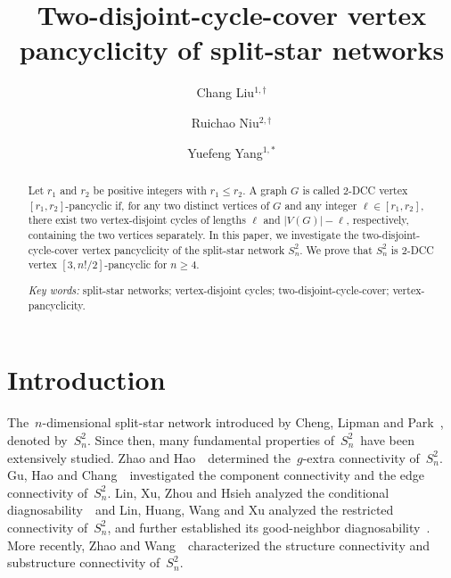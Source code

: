 \documentclass[12pt,a4paper]{amsart}
\title[Two-disjoint-cycle-cover vertex pancyclicity of split-star networks]{Two-disjoint-cycle-cover vertex pancyclicity of split-star networks}
\date{}
\author[Liu]{Chang Liu$^{1,\dagger}$}
\author[Niu]{Ruichao Niu$^{2,\dagger}$}
\author[Yang]{Yuefeng Yang$^{1,*}$}
\theoremstyle{definition}
\begin{document}
	
	\begin{abstract}

	Let $r_1$ and $r_2$ be positive integers with $r_1 \le r_2$. A graph $G$ is called $2$-DCC vertex $[r_1,r_2]$-pancyclic if, for any two distinct vertices of $G$ and any integer $\ell \in [r_1,r_2]$, there exist two vertex-disjoint cycles of lengths $\ell$ and $|V(G)|-\ell$, respectively, containing the two vertices separately. In this paper, we investigate the two-disjoint-cycle-cover vertex pancyclicity of the split-star network $S_n^2$. We prove that $S_n^2$ is $2$-DCC vertex $[3,n!/2]$-pancyclic for $n\ge4$.	
		
		
	\textit{Key words:} split-star networks; vertex-disjoint cycles; two-disjoint-cycle-cover; vertex-pancyclicity.
		
	\end{abstract}
	\maketitle
	\section{Introduction}
	The~$n$-dimensional split-star network introduced by Cheng, Lipman and Park~\cite{CLP01}, denoted by~$S_n^2$.
	Since then, many fundamental properties of~$S_n^2$~have been extensively studied.
	Zhao and Hao~\cite{ZH18}~determined the~$g$-extra connectivity of~$S_n^2$.
	Gu, Hao and Chang~\cite{GHC19,GHC21}~investigated the component connectivity and the edge connectivity of~$S_n^2$.
	Lin, Xu, Zhou and Hsieh analyzed the conditional diagnosability~\cite{LXZH15}~and Lin, Huang, Wang and Xu analyzed the restricted connectivity of~$S_n^2$, and further established its good-neighbor diagnosability~\cite{LHWX20}.
	More recently, Zhao and Wang~\cite{ZW23}~characterized the structure connectivity and substructure connectivity of~$S_n^2$.
\end{document}
